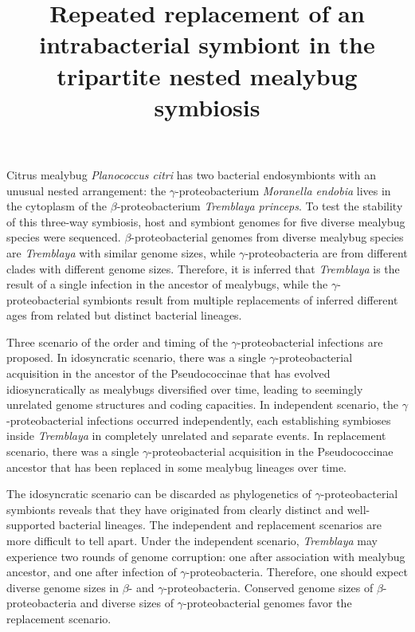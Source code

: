 \documentclass[11pt]{article}
\title{Repeated replacement of an intrabacterial symbiont in the tripartite nested mealybug symbiosis}
\author{}
\date{}
\begin{document}
\begin{sloppypar}
  \maketitle

  \linenumbers

Citrus mealybug \textit{Planococcus citri} has two bacterial endosymbionts with an unusual nested arrangement: the $\gamma$-proteobacterium \textit{Moranella endobia} lives in the cytoplasm of the $\beta$-proteobacterium \textit{Tremblaya princeps}. 
To test the stability of this three-way symbiosis, host and symbiont genomes for five diverse mealybug species were sequenced. 
$\beta$-proteobacterial genomes from diverse mealybug species are \textit{Tremblaya} with similar genome sizes, while $\gamma$-proteobacteria are from different clades with different genome sizes. 
Therefore, it is inferred that \textit{Tremblaya} is the result of a single infection in the ancestor of mealybugs, while the $\gamma$-proteobacterial symbionts result from multiple replacements of inferred different ages from related but distinct bacterial lineages. 

\par

Three scenario of the order and timing of the $\gamma$-proteobacterial infections are proposed. 
In idosyncratic scenario, there was a single $\gamma$-proteobacterial acquisition in the ancestor of the Pseudococcinae that has evolved idiosyncratically as mealybugs diversified over time, leading to seemingly unrelated genome structures and coding capacities. 
In independent scenario, the $\gamma$-proteobacterial infections occurred independently, each establishing symbioses inside \textit{Tremblaya} in completely unrelated and separate events. 
In replacement scenario, there was a single $\gamma$-proteobacterial acquisition in the Pseudococcinae ancestor that has been replaced in some mealybug lineages over time. 

\par

The idosyncratic scenario can be discarded as phylogenetics of $\gamma$-proteobacterial symbionts reveals that they have originated from clearly distinct and well-supported bacterial lineages. 
The independent and replacement scenarios are more difficult to tell apart. 
Under the independent scenario, \textit{Tremblaya} may experience two rounds of genome corruption: one after association with mealybug ancestor, and one after infection of $\gamma$-proteobacteria. 
Therefore, one should expect diverse genome sizes in $\beta$- and $\gamma$-proteobacteria. 
Conserved genome sizes of $\beta$-proteobacteria and diverse sizes of $\gamma$-proteobacterial genomes favor the replacement scenario. 


\end{sloppypar}
\end{document}
